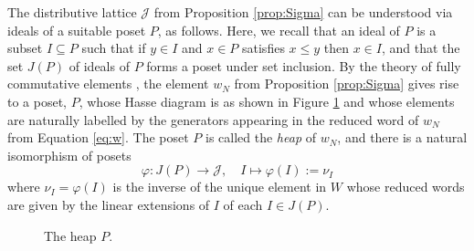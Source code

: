 \documentclass[11pt]{amsart}
\theoremstyle{plain}
\theoremstyle{definition}
\theoremstyle{remark}
\numberwithin{equation}{section}
\newcommand{\ra}{\rightarrow}
\newcommand{\wnn}{w_{N}}
\newcommand{\calj}{\mathcal{J}}
\newcommand{\se}{\subseteq}
\begin{document}
The distributive lattice $\calj$ from Proposition \ref{prop:Sigma} can be
understood via ideals of a suitable poset $P$, as follows. Here, we recall that
an ideal of $P$ is a subset $I\se P$ such that if $y\in I$ and $x\in P$
satisfies $x\le y$ then $x\in I$, and that the set $J(P)$ of ideals of $P$ forms
a poset under set inclusion. By the theory of fully commutative elements
\cite[Section 2.2,  Theorem 3.2]{FC}, the element $\wnn$ from Proposition
\ref{prop:Sigma} gives rise to a poset, $P$,
whose Hasse diagram is as shown in Figure \ref{fig:heap} and whose elements are
naturally labelled by the generators appearing in the reduced word of $\wnn$ from
Equation \eqref{eq:w}. The poset $P$ is called the \emph{heap} of $\wnn$, and there is a natural isomorphism of posets 
\begin{equation}
\label{eq:ideal_to_elt}
\varphi: J(P)\ra \calj, \quad I\mapsto \varphi(I):=\nu_I
\end{equation}
where $\nu_I= \varphi(I)$ is the inverse of the unique element in $W$ whose
reduced words are
given by the linear extensions of $I$ of each $I\in J(P)$.

\begin{figure}[h!]
    \caption{The heap $P$.}
    \label{fig:heap}
\end{figure}
\end{document}
